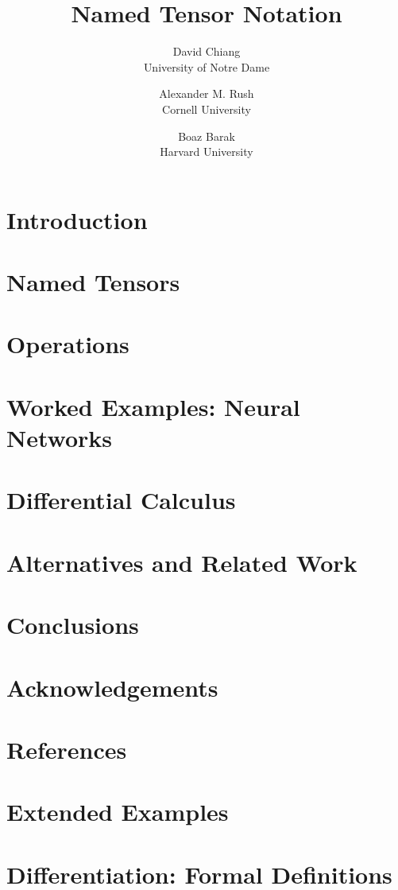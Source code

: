\documentclass[10pt]{article}
\title{Named Tensor Notation}
\author{David Chiang \\ University of Notre Dame \and Alexander M. Rush \\ Cornell University \and Boaz Barak \\ Harvard University}
\begin{document}
\maketitle

\section{Introduction}
\label{sec:intro}


\section{Named Tensors}


\section{Operations}
\label{sec:operations}


\section{Worked Examples: Neural Networks}
\label{sec:examples}


\section{Differential Calculus}
\label{sec:calculus}


\section{Alternatives and Related Work}


\section{Conclusions}


\section*{Acknowledgements}


\section*{References}




\appendix

\section{Extended Examples}
\label{sec:examples_long}


\section{Differentiation: Formal Definitions}
\label{sec:calculus_formal}



\end{document}
